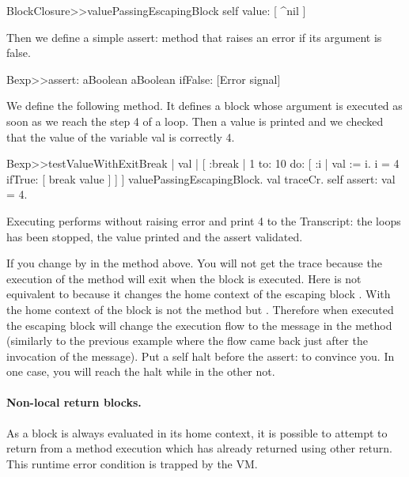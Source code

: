 \documentclass[a4paper,10pt,twoside]{book}
\begin{document}
\begin{code}{}
BlockClosure>>valuePassingEscapingBlock
	  self value: [ ^nil ]
\end{code}

Then we define a simple assert: method that raises an error if its argument is false.

\begin{code}{}
Bexp>>assert: aBoolean
	aBoolean ifFalse: [Error signal]
\end{code}

We define the following method. It defines a block whose argument is executed as soon as we reach the step 4 of a loop. Then a value is printed and we checked that the value of the variable val is correctly 4.

\begin{code}{}
Bexp>>testValueWithExitBreak
	| val |
	[ :break |
	    1 to: 10 do: [ :i |
			         val := i.
			         i = 4 ifTrue: [ break value ] ] ] valuePassingEscapingBlock.
	val traceCr.
	self assert: val = 4.
\end{code}

Executing  performs without raising error and print 4 to the Transcript: the loops has been stopped, the value printed and the assert validated.

If you change  by  in the method above. You will not get the trace because the execution of the method  will exit when the block is executed. Here  is not equivalent to  because it changes the home context of the escaping block \ct{[ ^ nil ]}.  With  the home context of the block \ct{[^ nil]}
is not the method  but .
Therefore when executed the escaping block will change the execution flow to the  message in the method  (similarly to the previous example where the flow came back just after the invocation of the  message).
Put a self halt before the assert: to convince you. In one case, you will reach the halt while in the other not.


\paragraph{Non-local return blocks.} As a block is always evaluated in its home context, it is possible to attempt to return from a method execution which has already returned using other return. This runtime error condition is trapped by the VM.
\end{document}
